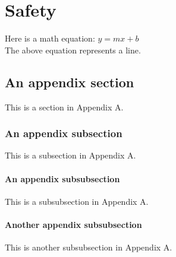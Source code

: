 \chapter{Safety} \label{appendixA}

Here is a math equation: $y = mx + b$\\
The above equation represents a line.

\section{An appendix section} \label{appAsect}

This is a section in Appendix A.
\newpage

\subsection{An appendix subsection} \label{appAsubsect}

This is a subsection in Appendix A.

\subsubsection{An appendix subsubsection} \label{appAsubsubsect}

This is a subsubsection in Appendix A.

\subsubsection{Another appendix subsubsection} \label{appAsubsubsect2}

This is another subsubsection in Appendix A.

